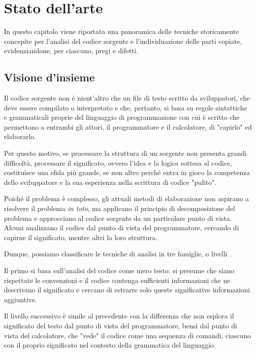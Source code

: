 \chapter{Stato dell'arte}
\label{chapter:stateOfArt}
In questo capitolo viene riportata una panoramica delle tecniche storicamente concepite per l'analisi del codice sorgente e l'individuazione delle parti copiate, evidenziandone, per ciascuno, pregi e difetti.

\section{Visione d'insieme}
Il codice sorgente non è nient'altro che un file di testo scritto da sviluppatori, che deve essere compilato o interpretato e che, pertanto, si basa su regole sintattiche e grammaticali proprie del linguaggio di programmazione con cui è scritto che permettono a entrambi gli attori, il programmatore e il calcolatore, di "capirlo" ed elaborarlo.

Per questo motivo, se processare la struttura di un sorgente non presenta grandi difficoltà, processare il significato, ovvero l'idea e la logica sottesa al codice, costituisce una sfida più grande, se non altro perché entra in gioco la competenza dello sviluppatore e la sua esperienza nella scrittura di codice "pulito".

Poiché il problema è complesso, gli attuali metodi di elaborazione non aspirano a risolvere il problema \textit{in toto}, ma applicano il principio di decomposizione del problema e approcciano al codice sorgente da un particolare punto di vista.
%
Alcuni analizzano il codice dal punto di vista del programmatore, cercando di capirne il significato, mentre altri la loro struttura.

Dunque, possiamo classificare le tecniche di analisi in tre famiglie, o livelli \cite{duracik-krsak-hrkut-2017}.

Il primo si basa sull'analisi del codice come mero testo: si presume che siano rispettate le convenzioni e il codice contenga sufficienti informazioni che ne descrivano il significato e cercano di estrarre solo queste significative informazioni aggiuntive.

Il livello successivo è simile al precedente con la differenza che non esplora il significato del testo dal punto di vista del programmatore, bensì dal punto di vista del calcolatore, che "vede" il codice come una sequenza di comandi, ciascuno con il proprio significato nel contesto della grammatica del linguaggio.

